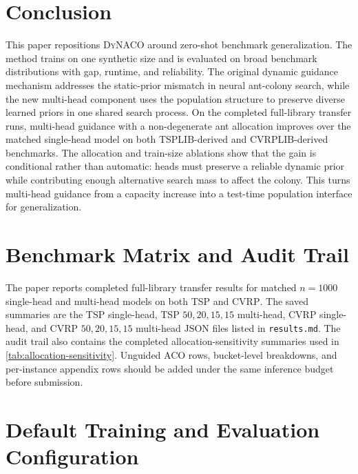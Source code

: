 \documentclass[11pt]{article}
\newcommand{\TSP}{\textsc{TSP}}
\newcommand{\CVRP}{\textsc{CVRP}}
\newcommand{\DyNACO}{\textsc{DyNACO}}
\newcommand{\cref}[1]{\ref{#1}}
\begin{document}
\section{Conclusion}
\label{sec:conclusion}

This paper repositions \DyNACO{} around zero-shot benchmark generalization.
The method trains on one synthetic size and is evaluated on broad benchmark distributions with gap, runtime, and reliability.
The original dynamic guidance mechanism addresses the static-prior mismatch in neural ant-colony search, while the new multi-head component uses the population structure to preserve diverse learned priors in one shared search process.
On the completed full-library transfer runs, multi-head guidance with a non-degenerate ant allocation improves over the matched single-head model on both TSPLIB-derived and CVRPLIB-derived benchmarks.
The allocation and train-size ablations show that the gain is conditional rather than automatic: heads must preserve a reliable dynamic prior while contributing enough alternative search mass to affect the colony.
This turns multi-head guidance from a capacity increase into a test-time population interface for generalization.

\appendix

\section{Benchmark Matrix and Audit Trail}
\label{app:checklist}

The paper reports completed full-library transfer results for matched $n=1000$ single-head and multi-head models on both \TSP{} and \CVRP{}.
The saved summaries are the TSP single-head, TSP $50,20,15,15$ multi-head, CVRP single-head, and CVRP $50,20,15,15$ multi-head JSON files listed in \texttt{results.md}.
The audit trail also contains the completed allocation-sensitivity summaries used in \cref{tab:allocation-sensitivity}.
Unguided ACO rows, bucket-level breakdowns, and per-instance appendix rows should be added under the same inference budget before submission.

\section{Default Training and Evaluation Configuration}
\label{app:config}
\end{document}
